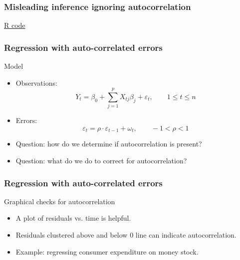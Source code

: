 \documentclass[handout]{beamer}
\begin{document}
   \begin{frame}
   \frametitle{Misleading inference ignoring autocorrelation}
   \begin{center}
   \end{center}
   \href{http://stats191.stanford.edu/correlated_errors.html#simulating-time-series}{R code}
   \end{frame}


   \begin{frame} \frametitle{Regression with auto-correlated errors}

   \begin{block}
   {Model}
   \begin{itemize}
   \item Observations:
   $$
   Y_t = \beta_0 + \sum_{j=1}^p X_{tj} \beta_j + \varepsilon_t, \qquad 1 \leq t \leq n$$

   \item Errors:
   $$
   \varepsilon_t = \rho \cdot \varepsilon_{t-1} + \omega_t, \qquad -1 < \rho < 1$$

   \item Question: how do we determine if autocorrelation is present?

   \item Question: what do we do to correct for autocorrelation?
   \end{itemize}
   \end{block}
   \end{frame}


   \begin{frame} \frametitle{Regression with auto-correlated errors}

   \begin{block}
   {Graphical checks for autocorrelation }
   \begin{itemize}

   \item A plot of residuals vs. time is helpful.

   \item Residuals clustered above and below 0 line can indicate
   autocorrelation.

   \item Example: regressing consumer expenditure on money stock.

   \end{itemize}
   \end{block}
   \end{frame}
\end{document}
